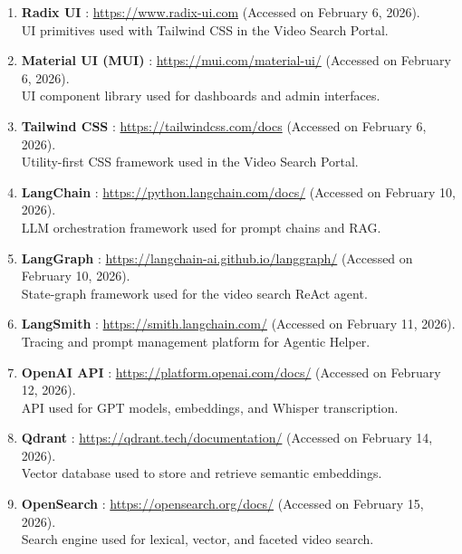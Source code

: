 \begin{enumerate}[leftmargin=0pt]
  \item \label{web:radixui} \textbf{Radix UI} :
        \url{https://www.radix-ui.com} (Accessed on February 6, 2026).\\
        UI primitives used with Tailwind CSS in the Video Search Portal.

  \item \label{web:mui} \textbf{Material UI (MUI)} :
        \url{https://mui.com/material-ui/} (Accessed on February 6, 2026).\\
        UI component library used for dashboards and admin interfaces.

  \item \label{web:tailwind} \textbf{Tailwind CSS} :
        \url{https://tailwindcss.com/docs} (Accessed on February 6, 2026).\\
        Utility-first CSS framework used in the Video Search Portal.

  \item \label{web:langchain} \textbf{LangChain} :
        \url{https://python.langchain.com/docs/} (Accessed on February 10, 2026).\\
        LLM orchestration framework used for prompt chains and RAG.

  \item \label{web:langgraph} \textbf{LangGraph} :
        \url{https://langchain-ai.github.io/langgraph/} (Accessed on February 10, 2026).\\
        State-graph framework used for the video search ReAct agent.

  \item \label{web:langsmith} \textbf{LangSmith} :
        \url{https://smith.langchain.com/} (Accessed on February 11, 2026).\\
        Tracing and prompt management platform for Agentic Helper.

  \item \label{web:openai} \textbf{OpenAI API} :
        \url{https://platform.openai.com/docs/} (Accessed on February 12, 2026).\\
        API used for GPT models, embeddings, and Whisper transcription.

  \item \label{web:qdrant} \textbf{Qdrant} :
        \url{https://qdrant.tech/documentation/} (Accessed on February 14, 2026).\\
        Vector database used to store and retrieve semantic embeddings.

  \item \label{web:opensearch} \textbf{OpenSearch} :
        \url{https://opensearch.org/docs/} (Accessed on February 15, 2026).\\
        Search engine used for lexical, vector, and faceted video search.


\end{enumerate}
